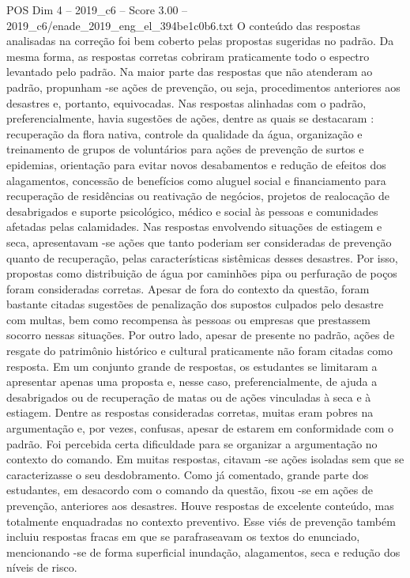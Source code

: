 \begin{textsample}{POS Dim 4 – 2019\_c6 – Score 3.00 – 2019\_c6/enade\_2019\_eng\_el\_394be1c0b6.txt}
O conteúdo das respostas analisadas na correção foi bem coberto pelas propostas sugeridas no padrão.
Da mesma forma, as respostas corretas cobriram praticamente todo o espectro levantado pelo padrão.
Na maior parte das respostas que não atenderam ao padrão, propunham -se ações de prevenção, ou seja, procedimentos anteriores aos desastres e, portanto, equivocadas.
Nas respostas alinhadas com o padrão, preferencialmente, havia sugestões de ações, dentre as quais se destacaram : recuperação da flora nativa, controle da qualidade da água, organização e treinamento de grupos de voluntários para ações de prevenção de surtos e epidemias, orientação para evitar novos desabamentos e redução de efeitos dos alagamentos, concessão de benefícios como aluguel social e financiamento para recuperação de residências ou reativação de negócios, projetos de realocação de desabrigados e suporte psicológico, médico e social às pessoas e comunidades afetadas pelas calamidades.
Nas respostas envolvendo situações de estiagem e seca, apresentavam -se ações que tanto poderiam ser consideradas de prevenção quanto de recuperação, pelas características sistêmicas desses desastres.
Por isso, propostas como distribuição de água por caminhões pipa ou perfuração de poços foram consideradas corretas.
Apesar de fora do contexto da questão, foram bastante citadas sugestões de penalização dos supostos culpados pelo desastre com multas, bem como recompensa às pessoas ou empresas que prestassem socorro nessas situações.
Por outro lado, apesar de presente no padrão, ações de resgate do patrimônio histórico e cultural praticamente não foram citadas como resposta.
Em um conjunto grande de respostas, os estudantes se limitaram a apresentar apenas uma proposta e, nesse caso, preferencialmente, de ajuda a desabrigados ou de recuperação de matas ou de ações vinculadas à seca e à estiagem.
Dentre as respostas consideradas corretas, muitas eram pobres na argumentação e, por vezes, confusas, apesar de estarem em conformidade com o padrão.
Foi percebida certa dificuldade para se organizar a argumentação no contexto do comando.
Em muitas respostas, citavam -se ações isoladas sem que se caracterizasse o seu desdobramento.
Como já comentado, grande parte dos estudantes, em desacordo com o comando da questão, fixou -se em ações de prevenção, anteriores aos desastres.
Houve respostas de excelente conteúdo, mas totalmente enquadradas no contexto preventivo.
Esse viés de prevenção também incluiu respostas fracas em que se parafraseavam os textos do enunciado, mencionando -se de forma superficial inundação, alagamentos, seca e redução dos níveis de risco.

\end{textsample}
